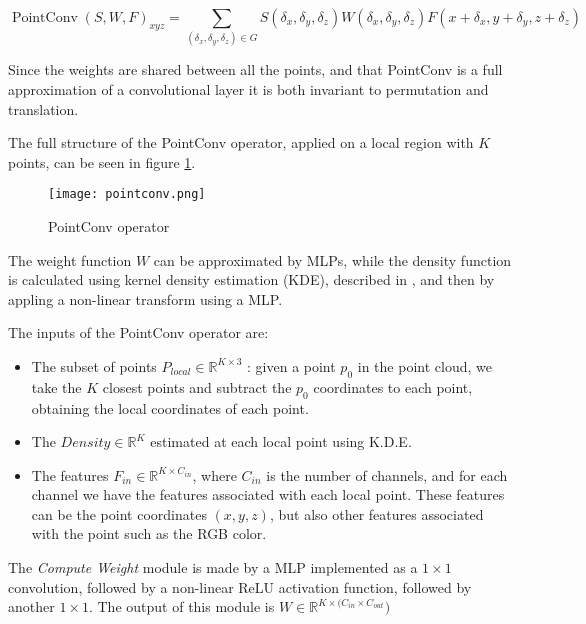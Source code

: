 \begin{equation}
    \operatorname{PointConv} (S, W, F)_{x y z}=
\sum_{\left(\delta_{x}, \delta_{y}, \delta_{z}\right) \in G} S\left(\delta_{x}, \delta_{y}, \delta_{z}\right) W\left(\delta_{x}, \delta_{y}, \delta_{z}\right) F\left(x+\delta_{x}, y+\delta_{y}, z+\delta_{z}\right)
\end{equation}

Since the weights are shared between all the points, and that PointConv is a full approximation of a convolutional layer it is both invariant to permutation and translation.

The full structure of the PointConv operator, applied on a local region with $K$ points, can be seen in figure \ref{fig:pointconvOperator}.

\begin{figure}[ht]
    \centering
    \texttt{[image: pointconv.png]}
    \caption{PointConv operator}
    \label{fig:pointconvOperator}
\end{figure}

The weight function $W$ can be approximated by MLPs, while the density function is calculated using kernel density estimation (KDE), described in \cite{Turlach_bandwidthselection}, and then by appling a non-linear transform using a MLP.

The inputs of the PointConv operator are:

\begin{itemize}
    \item The subset of points $P_{local} \in \mathbb{R}^{K \times 3}$ : given a point $p_0$ in the point cloud, we take the $K$ closest points and subtract the $p_0$ coordinates to each point, obtaining the local coordinates of each point.
    \item The $ Density \in \mathbb{R} ^{K}$ estimated at each local point using K.D.E.
    \item The features $F_{in} \in \mathbb{R}^{K \times C_{in}}$, where $C_{in}$ is the number of channels, and for each channel we have the features associated with each local point. These features can be the point coordinates $(x, y, z)$, but also other features associated with the point such as the RGB color.
\end{itemize}

The \textit{Compute Weight} module is made by a MLP implemented as a $1 \times 1$ convolution, followed by a non-linear ReLU activation function, followed by another $1 \times 1$. The output of this module is $W \in \mathbb{R}^{K \times (C_{in} \times C_{out}})$

